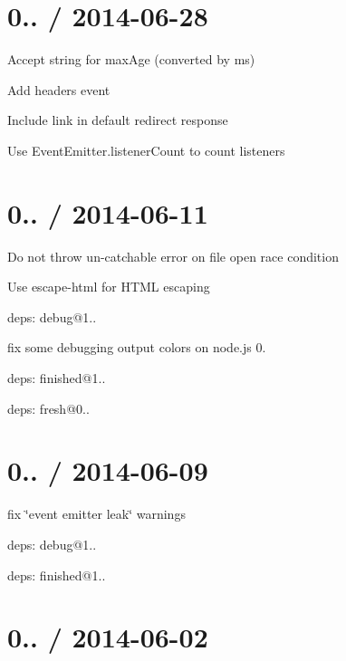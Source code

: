 \section*{0.. / 2014-\/06-\/28 }


\begin{DoxyItemize}
\item Accept string for {\ttfamily max\+Age} (converted by {\ttfamily ms})
\item Add {\ttfamily headers} event
\item Include link in default redirect response
\item Use {\ttfamily Event\+Emitter.\+listener\+Count} to count listeners
\end{DoxyItemize}

\section*{0.. / 2014-\/06-\/11 }


\begin{DoxyItemize}
\item Do not throw un-\/catchable error on file open race condition
\item Use {\ttfamily escape-\/html} for H\+T\+M\+L escaping
\item deps\+: debug@1..
\begin{DoxyItemize}
\item fix some debugging output colors on node.\+js 0.
\end{DoxyItemize}
\item deps\+: finished@1..
\item deps\+: fresh@0..
\end{DoxyItemize}

\section*{0.. / 2014-\/06-\/09 }


\begin{DoxyItemize}
\item fix \char`\"{}event emitter leak\char`\"{} warnings
\item deps\+: debug@1..
\item deps\+: finished@1..
\end{DoxyItemize}

\section*{0.. / 2014-\/06-\/02 }


